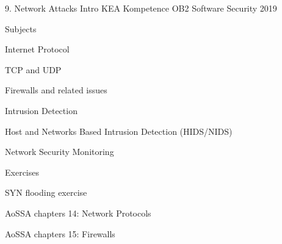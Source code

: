 \documentclass[Screen16to9,17pt]{foils}
\begin{document}
\mytitlepage
{9. Network Attacks Intro}
{KEA Kompetence OB2 Software Security 2019}


\begin{list1}
\item Subjects
\begin{list2}
\item Internet Protocol
\item TCP and UDP
\item Firewalls and related issues
\item Intrusion Detection
\item Host and Networks Based Intrusion Detection (HIDS/NIDS)
\item Network Security Monitoring
\end{list2}
\item Exercises
\begin{list2}
\item SYN flooding exercise
\end{list2}
\end{list1}


\begin{list1}
\item AoSSA chapters 14: Network Protocols
\item AoSSA chapters 15: Firewalls
\end{list1}



\begin{list1}
\item
\end{list1}




\end{document}
